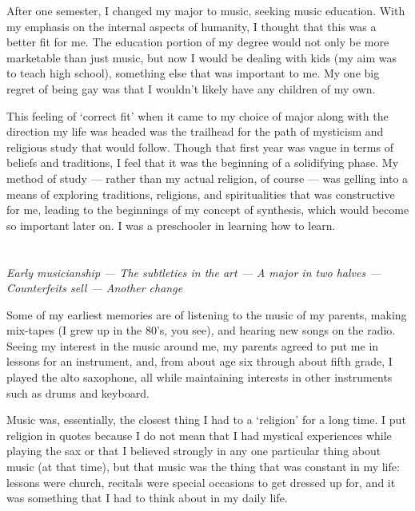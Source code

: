 \documentclass{book}
\begin{document}
After one semester, I changed my major to music, seeking music education.  With my emphasis on the internal aspects of humanity, I thought that this was a better fit for me.  The education portion of my degree would not only be more marketable than just music, but now I would be dealing with kids (my aim was to teach high school), something else that was important to me.  My one big regret of being gay was that I wouldn't likely have any children of my own.

This feeling of `correct fit' when it came to my choice of major along with the direction my life was headed was the trailhead for the path of mysticism and religious study that would follow.  Though that first year was vague in terms of beliefs and traditions, I feel that it was the beginning of a solidifying phase.  My method of study --- rather than my actual religion, of course --- was gelling into a means of exploring traditions, religions, and spiritualities that was constructive for me, leading to the beginnings of my concept of synthesis, which would become so important later on.  I was a preschooler in learning how to learn.

\chapter{}
\begin{center}
	\emph{Early musicianship --- The subtleties in the art --- A major in two halves --- Counterfeits sell --- Another change}
\end{center}

Some of my earliest memories are of listening to the music of my parents, making mix-tapes (I grew up in the 80's, you see), and hearing new songs on the radio.  Seeing my interest in the music around me, my parents agreed to put me in lessons for an instrument, and, from about age six through about fifth grade, I played the alto saxophone, all while maintaining interests in other instruments such as drums and keyboard.

Music was, essentially, the closest thing I had to a `religion' for a long time.  I put religion in quotes because I do not mean that I had mystical experiences while playing the sax or that I believed strongly in any one particular thing about music (at that time), but that music was the thing that was constant in my life: lessons were church, recitals were special occasions to get dressed up for, and it was something that I had to think about in my daily life.
\end{document}
